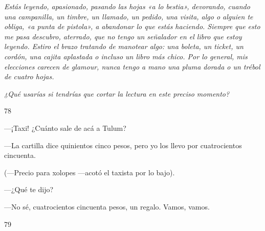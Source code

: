 \documentclass[12pt,twoside,openright,a5paper]{book}
\begin{document}
\nopagebreak

\vspace{0.5cm}

\nopagebreak

\emph{Estás leyendo, apasionado, pasando las hojas «a lo bestia», devorando, cuando
una campanilla, un timbre, un llamado, un pedido, una visita, algo o alguien
te obliga, «a punta de pistola», a abandonar lo que estás haciendo. Siempre
que esto me pasa descubro, aterrado, que no tengo un señalador en el libro
que estoy leyendo. Estiro el brazo tratando de manotear algo: una boleta, un
ticket, un cordón, una cajita aplastada o incluso un libro más chico. Por
lo general, mis elecciones carecen de glamour, nunca tengo a mano una pluma
dorada o un trébol de cuatro hojas.}

\emph{¿Qué usarías si tendrías que cortar la lectura en este preciso momento?}

\vspace{0.5cm}

\hrulefill \hspace{0.1cm}\decofourleft\hspace{0.2cm} 78 \hspace{0.2cm}\decofourright \hspace{0.1cm}\hrulefill

\nopagebreak

\vspace{0.5cm}

\nopagebreak

---¡Taxi! ¿Cuánto sale de acá a Tulum?

---La cartilla dice quinientos cinco pesos, pero yo los llevo por cuatrocientos cincuenta.

(---Precio para xolopes ---acotó el taxista por lo bajo).

---¿Qué te dijo?

---No sé, cuatrocientos cincuenta pesos, un regalo. Vamos, vamos.

\vspace{0.5cm}

\hrulefill \hspace{0.1cm}\decofourleft\hspace{0.2cm} 79 \hspace{0.2cm}\decofourright \hspace{0.1cm}\hrulefill

\nopagebreak

\vspace{0.5cm}
\end{document}
